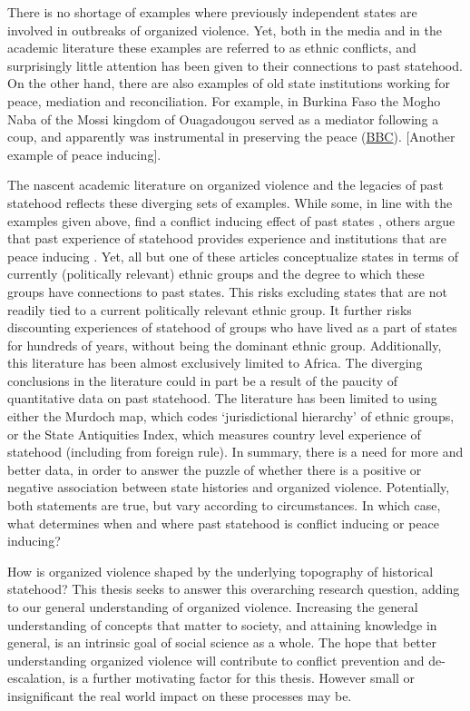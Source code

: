 \documentclass[12pt]{article}
\begin{document}
There is no shortage of examples where previously independent states are
involved in outbreaks of organized violence. Yet, both in the media and in the
academic literature these examples are referred to as ethnic conflicts, and
surprisingly little attention has been given to their connections to past
statehood. On the other hand, there are also examples of old state institutions
working for peace, mediation and reconciliation. For example, in Burkina Faso
the Mogho Naba of the Mossi kingdom of Ouagadougou served as a mediator
following a coup, and apparently was instrumental in preserving the peace
(\href{https://www.bbc.com/news/world-africa-34340704}{BBC}). [Another example
of peace inducing]. 

The nascent academic literature on organized violence and the legacies of past
statehood reflects these diverging sets of examples. While some, in line with
the examples given above, find a conflict inducing effect of past states
\citep{Englebert2002, Paine2019}, others argue that past experience of statehood
provides experience and institutions that are peace inducing \citep{Wig2016,
Wig2018, Depetris-Chauvin2016}. Yet, all but one of these articles conceptualize
states in terms of currently (politically relevant) ethnic groups and the degree
to which these groups have connections to past states. This risks excluding
states that are not readily tied to a current politically relevant ethnic group.
It further risks discounting experiences of statehood of groups who have lived
as a part of states for hundreds of years, without being the dominant ethnic
group. Additionally, this literature has been almost exclusively limited to
Africa. The diverging conclusions in the literature could in part be a result of
the paucity of quantitative data on past statehood. The literature has been
limited to using either the Murdoch map, which codes `jurisdictional hierarchy'
of ethnic groups, or the State Antiquities Index, which measures country level
experience of statehood (including from foreign rule). In summary, there is a
need for more and better data, in order to answer the puzzle of whether there is
a positive or negative association between state histories and organized
violence. Potentially, both statements are true, but vary according to
circumstances. In which case, what determines when and where past statehood is
conflict inducing or peace inducing?


How is organized violence shaped by the underlying topography of historical
statehood? This thesis seeks to answer this overarching research question,
adding to our general understanding of organized violence. Increasing the
general understanding of concepts that matter to society, and attaining
knowledge in general, is an intrinsic goal of social science as a whole. The
hope that better understanding organized violence will contribute to conflict
prevention and de-escalation, is a further motivating factor for this thesis.
However small or insignificant the real world impact on these processes may be.
\end{document}
